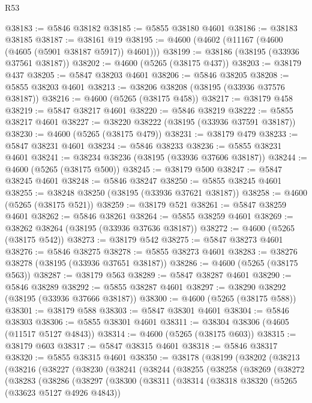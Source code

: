 \begin{lexlean}{R53}
\begin{coremodule}
@38183 := @5846 @38182
@38185 := @5855 @38180 @4601
@38186 := @38183 @38185
@38187 := @38161 @19
@38195 := @4600 (@4602 (@11167 (@4600 (@4605 (@5901 @38187 @5917)) @4601)))
@38199 := @38186 (@38195 (@33936 @37561 @38187))
@38202 := @4600 (@5265 (@38175 @437))
@38203 := @38179 @437
@38205 := @5847 @38203 @4601
@38206 := @5846 @38205
@38208 := @5855 @38203 @4601
@38213 := @38206 @38208 (@38195 (@33936 @37576 @38187))
@38216 := @4600 (@5265 (@38175 @458))
@38217 := @38179 @458
@38219 := @5847 @38217 @4601
@38220 := @5846 @38219
@38222 := @5855 @38217 @4601
@38227 := @38220 @38222 (@38195 (@33936 @37591 @38187))
@38230 := @4600 (@5265 (@38175 @479))
@38231 := @38179 @479
@38233 := @5847 @38231 @4601
@38234 := @5846 @38233
@38236 := @5855 @38231 @4601
@38241 := @38234 @38236 (@38195 (@33936 @37606 @38187))
@38244 := @4600 (@5265 (@38175 @500))
@38245 := @38179 @500
@38247 := @5847 @38245 @4601
@38248 := @5846 @38247
@38250 := @5855 @38245 @4601
@38255 := @38248 @38250 (@38195 (@33936 @37621 @38187))
@38258 := @4600 (@5265 (@38175 @521))
@38259 := @38179 @521
@38261 := @5847 @38259 @4601
@38262 := @5846 @38261
@38264 := @5855 @38259 @4601
@38269 := @38262 @38264 (@38195 (@33936 @37636 @38187))
@38272 := @4600 (@5265 (@38175 @542))
@38273 := @38179 @542
@38275 := @5847 @38273 @4601
@38276 := @5846 @38275
@38278 := @5855 @38273 @4601
@38283 := @38276 @38278 (@38195 (@33936 @37651 @38187))
@38286 := @4600 (@5265 (@38175 @563))
@38287 := @38179 @563
@38289 := @5847 @38287 @4601
@38290 := @5846 @38289
@38292 := @5855 @38287 @4601
@38297 := @38290 @38292 (@38195 (@33936 @37666 @38187))
@38300 := @4600 (@5265 (@38175 @588))
@38301 := @38179 @588
@38303 := @5847 @38301 @4601
@38304 := @5846 @38303
@38306 := @5855 @38301 @4601
@38311 := @38304 @38306 (@4605 (@11517 @5127 @4843))
@38314 := @4600 (@5265 (@38175 @603))
@38315 := @38179 @603
@38317 := @5847 @38315 @4601
@38318 := @5846 @38317
@38320 := @5855 @38315 @4601
@38350 := @38178
    (@38199
      (@38202
        (@38213
          (@38216
            (@38227
              (@38230
                (@38241
                  (@38244
                    (@38255
                      (@38258
                        (@38269
                          (@38272
                            (@38283
                              (@38286
                                (@38297
                                  (@38300
                                    (@38311
                                      (@38314
                                        (@38318
                                          @38320
                                          (@5265 (@33623 @5127 @4926 @4843))

\end{coremodule}
\end{lexlean}
